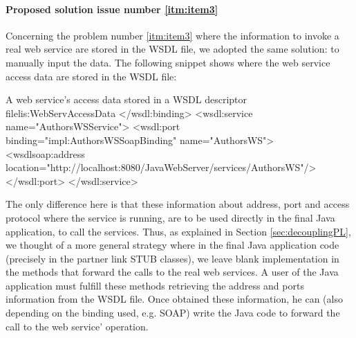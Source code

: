 \paragraph{Proposed solution issue number \ref{itm:item3}}
Concerning the problem number \ref{itm:item3} where the information to invoke a real web service are stored in the WSDL file, we adopted the same solution: to manually input the data. The following snippet shows where the web service access data are stored in the WSDL file:
  
\begin{workflow-code}{A web service's access data stored in a WSDL descriptor file}{lis:WebServAccessData}
 </wsdl:binding>
   <wsdl:service name="AuthorsWSService">
      <wsdl:port binding="impl:AuthorsWSSoapBinding" name="AuthorsWS">
         <wsdlsoap:address location="http://localhost:8080/JavaWebServer/services/AuthorsWS"/>
      </wsdl:port>
   </wsdl:service>	
\end{workflow-code}
  
The only difference here is that these information about address, port and access protocol where the service is running, are to be used directly in the final Java application, to call the services. Thus, as explained in Section \ref{sec:decouplingPL}, we thought of a more general strategy where in the final Java application code (precisely in the partner link STUB classes), we leave blank implementation in the methods that forward the calls to the real web services. A user of the Java application must fulfill these methods retrieving the address and ports information from the WSDL file. Once obtained these information, he can (also depending on the binding used, e.g. SOAP) write the Java code to forward the call to the web service' operation.

  
